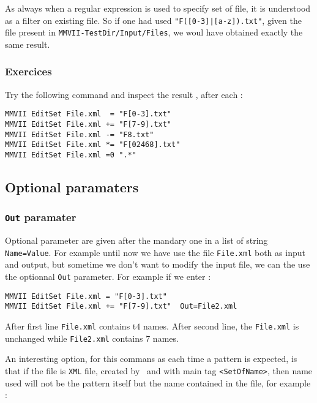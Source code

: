 As always when  a regular expression is used to specify set of file,
it is understood as a filter on existing file. So if one had used {\tt "F([0-3]|[a-z]).txt"},
given the file present in  {\tt {\MMVIDIR}MMVII-TestDir/Input/Files}, we woul have
obtained exactly the same result.

\subsubsection{Exercices}
Try the following command and inspect the result , after each :

\begin{verbatim}
MMVII EditSet File.xml  = "F[0-3].txt"
MMVII EditSet File.xml += "F[7-9].txt"
MMVII EditSet File.xml -= "F8.txt"
MMVII EditSet File.xml *= "F[02468].txt"
MMVII EditSet File.xml =0 ".*"
\end{verbatim}


\subsection{Optional paramaters}

\subsubsection{{\tt Out} paramater}

Optional parameter are given after  the  mandary one in a list of 
string {\tt Name=Value}. For example until now we have use
the file {\tt File.xml} both as input and output, but sometime
we don't want to modify the input file, we can the use the optionnal
{\tt Out} parameter. For example if we enter :

\begin{verbatim}
MMVII EditSet File.xml = "F[0-3].txt" 
MMVII EditSet File.xml += "F[7-9].txt"  Out=File2.xml
\end{verbatim}

After first line {\tt File.xml} contains t$4$ names.
After second line, the  {\tt File.xml} is unchanged
while  {\tt File2.xml} contains $7$ names.


An interesting option, for this commans as each time
a pattern is expected, is that if the file is {\tt XML}
file, created by \PPP\, and with main tag {\tt <SetOfName>},
then name used will not be the pattern itself but the name
contained in the file, for example : 


